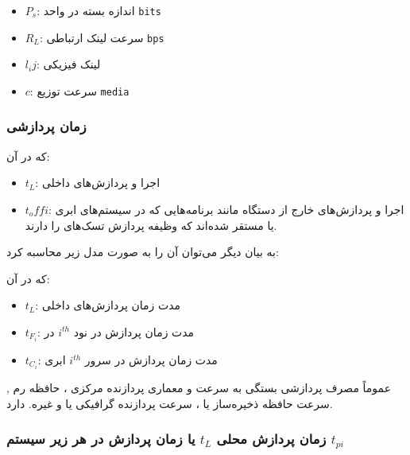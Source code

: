 \documentclass[a4paper]{article}
\begin{document}
\begin{itemize}
    \item $P_s$: اندازه بسته در واحد \texttt{bits}
    \item $R_L$: سرعت لینک ارتباطی \texttt{bps}
\end{itemize}


\begin{itemize}
    \item $l_ij$: لینک فیزیکی
    \item $c$: سرعت توزیع \texttt{media}
\end{itemize}

\subsubsection{زمان پردازشی}


که در آن:

\begin{itemize}
    \item $t_L$: اجرا و پردازش‌های داخلی
    \item $t_offi$: اجرا و پردازش‌های خارج از دستگاه  مانند برنامه‌هایی
    که در سیستم‌های ابری یا  مستقر شده‌اند که وظیفه پردازش تسک‌های
     را دارند.
\end{itemize}

به بیان دیگر می‌توان آن را به صورت مدل زیر محاسبه کرد:


که در آن:

\begin{itemize}
    \item $t_L$: مدت زمان پردازش‌های داخلی
    \item $t_{F_i}$: مدت زمان پردازش در نود $i^{th}$ در 
    \item $t_{C_i}$: مدت زمان پردازش در سرور $i^{th}$ ابری
\end{itemize}

عموماً مصرف پردازشی بستگی به سرعت و معماری پردازنده مرکزی ، حافظه رم
, سرعت حافظه ذخیره‌ساز  یا ، سرعت پردازنده گرافیکی
یا  و غیره. دارد.

\subsubsection{زمان پردازش محلی $t_L$ یا زمان پردازش در هر زیر سیستم $t_{pi}$}
\end{document}

